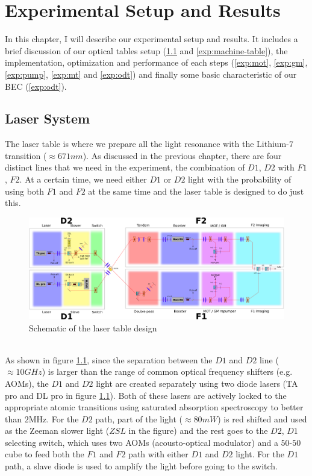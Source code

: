 \chapter{Experimental Setup and Results}

In this chapter, I will describe our experimental setup and results. It includes a brief discussion of our optical tables setup (\ref{exp:laser-table} and \ref{exp:machine-table}), the implementation, optimization and performance of each steps (\ref{exp:mot}, \ref{exp:gm}, \ref{exp:pump}, \ref{exp:mt} and \ref{exp:odt}) and finally some basic characteristic of our BEC (\ref{exp:odt}).

\section{Laser System}\label{exp:laser-table}
The laser table is where we prepare all the light resonance with the Lithium-$7$ transition ($\approx671nm$). As discussed in the previous chapter, there are four distinct lines that we need in the experiment, the combination of $D1$, $D2$ with $F1$, $F2$. At a certain time, we need either $D1$ or $D2$ light with the probability of using both $F1$ and $F2$ at the same time and the laser table is designed to do just this.\\
\begin{figure}
  \begin{center}
    \includegraphics[width=14cm]{laser_table.png}
  \end{center}
  \caption{Schematic of the laser table design}
  \label{exp:laser-table-design}
\end{figure}\\
As shown in figure \ref{exp:laser-table-design}, since the separation between the $D1$ and $D2$ line ($\approx10GHz$) is larger than the range of common optical frequency shifters (e.g. AOMs), the $D1$ and $D2$ light are created separately using two diode lasers (TA pro and DL pro in figure \ref{exp:laser-table-design}). Both of these lasers are actively locked to the appropriate atomic transitions using saturated absorption spectroscopy to better than $2\text{MHz}$. For the $D2$ path, part of the light ($\approx80mW$) is red shifted and used as the Zeeman slower light ($ZSL$ in the figure) and the rest goes to the $D2$, $D1$ selecting switch, which uses two AOMs (acousto-optical modulator) and a $50$-$50$ cube to feed both the $F1$ and $F2$ path with either $D1$ and $D2$ light. For the $D1$ path, a slave diode is used to amplify the light before going to the switch.\\
